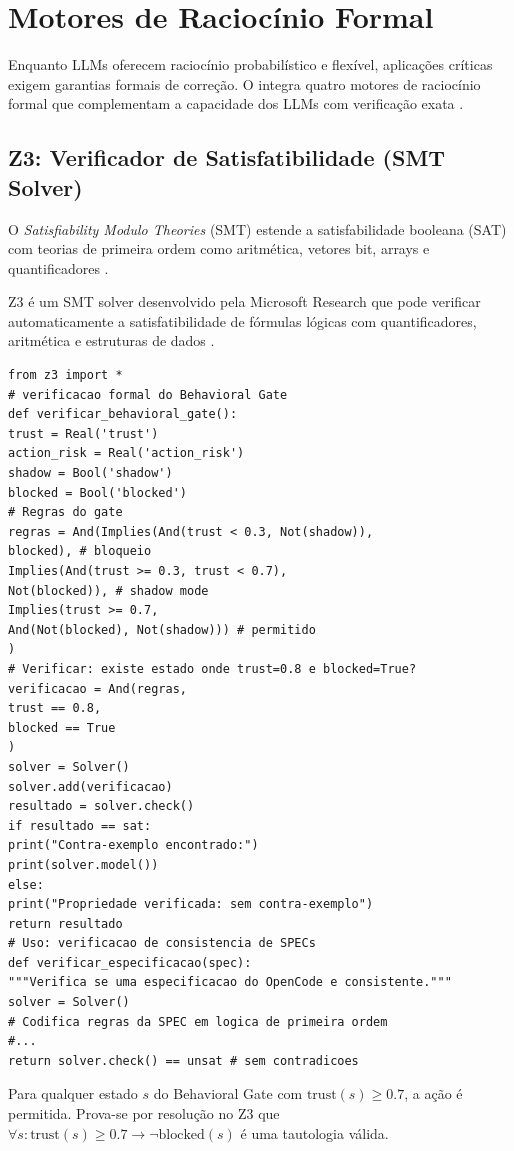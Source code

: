 \section{Motores de Raciocínio Formal}
\label{sec:motor formal}
\nivelphd
Enquanto LLMs oferecem raciocínio probabilístico e flexível, aplicações
críticas exigem garantias formais de correção. O \opencodeeco{} integra
quatro motores de raciocínio formal que complementam a capacidade dos LLMs
com verificação exata \cite{opencode2026ecosystem}.
\subsection{Z3: Verificador de Satisfatibilidade (SMT Solver)}
\begin{definicao}[SMT]
O \textit{Satisfiability Modulo Theories} (SMT) estende a satisfabilidade
booleana (SAT) com teorias de primeira ordem como aritmética, vetores
bit, arrays e quantificadores \cite{demoura2008z3}.
\end{definicao}
Z3 é um SMT solver desenvolvido pela Microsoft Research que pode verificar
automaticamente a satisfatibilidade de fórmulas lógicas com quantificadores,
aritmética e estruturas de dados \cite{demoura2008z3}.
\begin{lstlisting}[style=pythonstyle]
from z3 import *
# verificacao formal do Behavioral Gate
def verificar_behavioral_gate():
trust = Real('trust')
action_risk = Real('action_risk')
shadow = Bool('shadow')
blocked = Bool('blocked')
# Regras do gate
regras = And(Implies(And(trust < 0.3, Not(shadow)),
blocked), # bloqueio
Implies(And(trust >= 0.3, trust < 0.7),
Not(blocked)), # shadow mode
Implies(trust >= 0.7,
And(Not(blocked), Not(shadow))) # permitido
)
# Verificar: existe estado onde trust=0.8 e blocked=True?
verificacao = And(regras,
trust == 0.8,
blocked == True
)
solver = Solver()
solver.add(verificacao)
resultado = solver.check()
if resultado == sat:
print("Contra-exemplo encontrado:")
print(solver.model())
else:
print("Propriedade verificada: sem contra-exemplo")
return resultado
# Uso: verificacao de consistencia de SPECs
def verificar_especificacao(spec):
"""Verifica se uma especificacao do OpenCode e consistente."""
solver = Solver()
# Codifica regras da SPEC em logica de primeira ordem
#...
return solver.check() == unsat # sem contradicoes
\end{lstlisting}
\begin{proposicao}
Para qualquer estado $s$ do Behavioral Gate com $\text{trust}(s) \geq 0.7$,
a ação é permitida. Prova-se por resolução no Z3 que $\forall s:
\text{trust}(s) \geq 0.7 \to \neg\text{blocked}(s)$ é uma tautologia
válida.
\end{proposicao}
